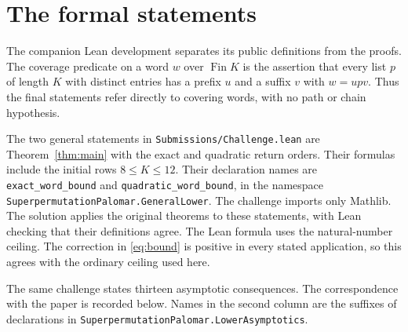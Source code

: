 \section{The formal statements}

The companion Lean development separates its public definitions from
the proofs. The coverage predicate on a word $w$ over $\operatorname{Fin}K$
is the assertion that every list $p$ of length $K$ with distinct entries
has a prefix $u$ and a suffix $v$ with $w=upv$. Thus the final statements
refer directly to covering words, with no path or chain hypothesis.

The two general statements in
\nolinkurl{Submissions/Challenge.lean}
are Theorem~\ref{thm:main} with the exact and quadratic return orders.
Their formulas include the initial rows $8\le K\le12$.
Their declaration names are \nolinkurl{exact_word_bound} and
\nolinkurl{quadratic_word_bound}, in the namespace
\nolinkurl{SuperpermutationPalomar.GeneralLower}.
The challenge imports only Mathlib. The solution applies the original
theorems to these statements, with Lean checking that their definitions
agree.
The Lean formula uses the natural-number ceiling. The correction in
\eqref{eq:bound} is positive in every stated application, so this
agrees with the ordinary ceiling used here.

The same challenge states thirteen asymptotic consequences. The correspondence
with the paper is recorded below. Names in the second column are the
suffixes of declarations in
\nolinkurl{SuperpermutationPalomar.LowerAsymptotics}.

